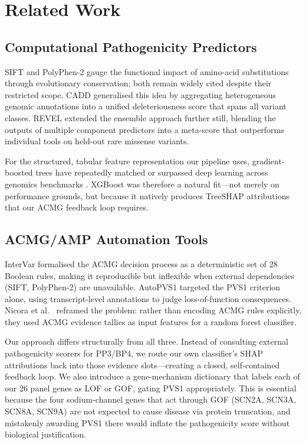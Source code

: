 \documentclass[conference]{IEEEtran}
\begin{document}
\section{Related Work}

\subsection{Computational Pathogenicity Predictors}

SIFT and PolyPhen-2 gauge the functional impact of amino-acid
substitutions through evolutionary conservation; both remain
widely cited despite their restricted scope. CADD \cite{cadd2014}
generalised this idea by aggregating heterogeneous genomic
annotations into a unified deleteriousness score that spans all
variant classes. REVEL \cite{revel2016} extended the ensemble
approach further still, blending the outputs of multiple component
predictors into a meta-score that outperforms individual tools
on held-out rare missense variants.

For the structured, tabular feature representation our pipeline
uses, gradient-boosted trees have repeatedly matched or surpassed
deep learning across genomics benchmarks \cite{parente2021}.
XGBoost \cite{chen2016xgboost} was therefore a natural fit---not
merely on performance grounds, but because it natively produces
TreeSHAP attributions that our ACMG feedback loop requires.

\subsection{ACMG/AMP Automation Tools}

InterVar \cite{intervar2017} formalised the ACMG decision process
as a deterministic set of 28 Boolean rules, making it reproducible
but inflexible when external dependencies (SIFT, PolyPhen-2) are
unavailable. AutoPVS1 \cite{autopvs1_2020} targeted the PVS1
criterion alone, using transcript-level annotations to judge
loss-of-function consequences. Nicora et al.\ \cite{nicora2022}
reframed the problem: rather than encoding ACMG rules explicitly,
they used ACMG evidence tallies as input features for a random
forest classifier.

Our approach differs structurally from all three. Instead of
consulting external pathogenicity scorers for PP3/BP4, we route
our own classifier's SHAP attributions back into those evidence
slots---creating a closed, self-contained feedback loop. We also
introduce a gene-mechanism dictionary that labels each of our 26
panel genes as LOF or GOF, gating PVS1 appropriately. This is
essential because the four sodium-channel genes that act through
GOF (SCN2A, SCN3A, SCN8A, SCN9A) are not expected to cause disease
via protein truncation, and mistakenly awarding PVS1 there would
inflate the pathogenicity score without biological justification.
\end{document}

